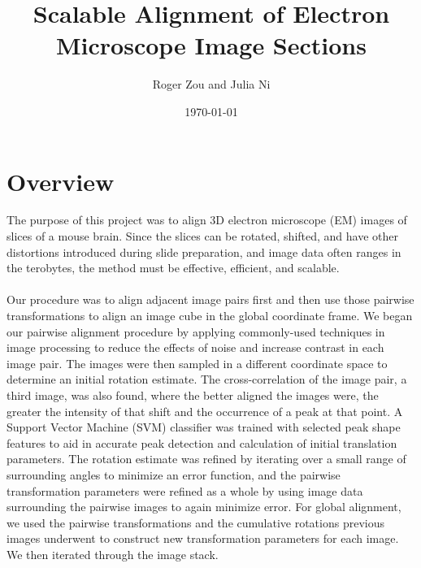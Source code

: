 \documentclass{article}
\author{Roger Zou and Julia Ni}
\date{\today}
\title{Scalable Alignment of Electron Microscope Image Sections}
\begin{document}
  
\maketitle
 
\section{Overview}
The purpose of this project was to align 3D electron microscope (EM) images of slices of a mouse brain. Since the slices can be rotated, shifted, and have other distortions introduced during slide preparation, and image data often ranges in the terobytes, the method must be effective, efficient, and scalable.\\
\\
Our procedure was to align adjacent image pairs first and then use those pairwise transformations to align an image cube in the global coordinate frame. We began our pairwise alignment procedure by applying commonly-used techniques in image processing to reduce the effects of noise and increase contrast in each image pair. The images were then sampled in a different coordinate space to determine an initial rotation estimate. The cross-correlation of the image pair, a third image, was also found, where the better aligned the images were, the greater the intensity of that shift and the occurrence of a peak at that point. A Support Vector Machine (SVM) classifier was trained with selected peak shape features to aid in accurate peak detection and calculation of initial translation parameters. The rotation estimate was refined by iterating over a small range of surrounding angles to minimize an error function, and the pairwise transformation parameters were refined as a whole by using image data surrounding the pairwise images to again minimize error. For global alignment, we used the pairwise transformations and the cumulative rotations previous images underwent to construct new transformation parameters for each image. We then iterated through the image stack. 
\end{document}
